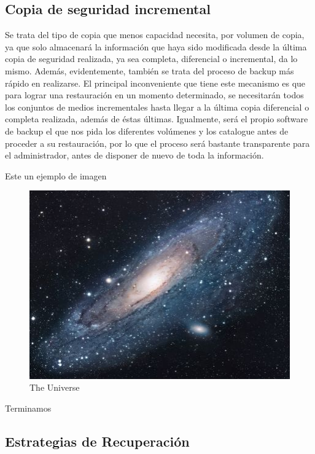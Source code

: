 \subsection{Copia de seguridad incremental}
Se trata del tipo de copia que menos capacidad necesita, por volumen de copia, ya que solo almacenará la información que haya sido modificada desde la última copia de seguridad realizada, ya sea completa, diferencial o incremental, da lo mismo. Además, evidentemente, también se trata del proceso de backup más rápido en realizarse. El principal inconveniente que tiene este mecanismo es que para lograr una restauración en un momento determinado, se necesitarán todos los conjuntos de medios incrementales hasta llegar a la última copia diferencial o completa realizada, además de éstas últimas. Igualmente, será el propio software de backup el que nos pida los diferentes volúmenes y los catalogue antes de proceder a su restauración, por lo que el proceso será bastante transparente para el administrador, antes de disponer de nuevo de toda la información.


Este un ejemplo de imagen

\begin{figure}[ht]
\centering
\includegraphics[scale=1.7]{images/universe.jpg}
\caption{The Universe}
\label{fig:universe}
\end{figure}

Terminamos

\subsection{Estrategias de Recuperaci\'on}

